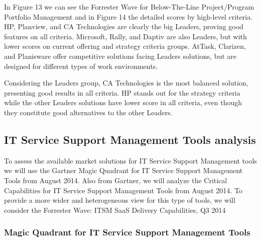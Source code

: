 In Figure 13 we can see the Forrester Wave for Below-The-Line Project/Program Portfolio Management and in Figure 14 the detailed scores by high-level criteria. HP, Planview, and CA Technologies are clearly the big Leaders, proving good features on all criteria. Microsoft, Rally, and Daptiv are also Leaders, but with lower scores on current offering and strategy criteria groups. AtTask, Clarizen, and Planisware offer competitive solutions facing Leaders solutions, but are designed for different types of work environments.\par
Considering the Leaders group, CA Technologies is the most balanced solution, presenting good results in all criteria. HP stands out for the strategy criteria while the other Leaders solutions have lower score in all criteria, even though they constitute good alternatives to the other Leaders.\par



\subsection{IT Service Support Management Tools analysis}

To assess the available market solutions for IT Service Support Management tools we will use the Gartner Magic Quadrant for IT Service Support Management Tools from August 2014\cite{magicQuadrantITSM}. Also from Gartner, we will analyze the Critical Capabilities for IT Service Support Management Tools from August 2014\cite{criticalCapabilitiesITSM}. To provide a more wider and heterogeneous view for this type of tools, we will consider the Forrester Wave: ITSM SaaS Delivery Capabilities, Q3 2014\cite{forresterWaveITSM}\par 

\subsubsection{Magic Quadrant for IT Service Support Management Tools}

